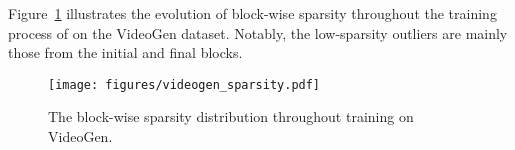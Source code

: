 Figure~\ref{figure:videogen_sparsity} illustrates the evolution of block-wise sparsity throughout the training process of \sys on the VideoGen dataset. Notably, the low-sparsity outliers are mainly those from the initial and final blocks.

\begin{figure}[]
  \centering
  \texttt{[image: figures/videogen\_sparsity.pdf]} 
    \vspace{-0.1in}
\caption{The block-wise sparsity distribution throughout \sys training on VideoGen. }
  \label{figure:videogen_sparsity} 
\end{figure}







